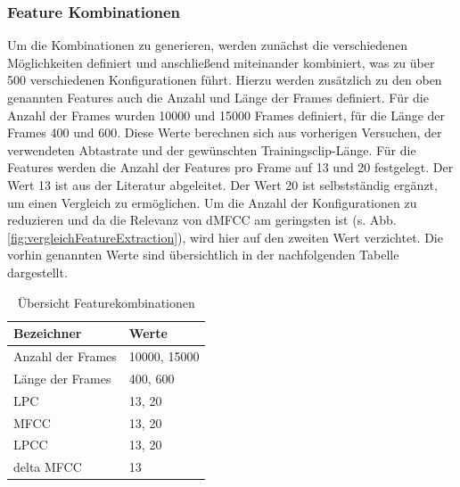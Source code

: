\subsubsection{Feature Kombinationen}

Um die Kombinationen zu generieren, werden zunächst die verschiedenen Möglichkeiten definiert und anschließend miteinander kombiniert, was zu über 500 verschiedenen Konfigurationen führt.
Hierzu werden zusätzlich zu den oben genannten Features auch die Anzahl und Länge der Frames definiert.
Für die Anzahl der Frames wurden 10000 und 15000 Frames definiert, für die Länge der Frames 400 und 600.
Diese Werte berechnen sich aus vorherigen Versuchen, der verwendeten Abtastrate und der gewünschten Trainingsclip-Länge.
Für die Features werden die Anzahl der Features pro Frame auf 13 und 20 festgelegt.
Der Wert 13 ist aus der Literatur abgeleitet. %
Der Wert 20 ist selbstständig ergänzt, um einen Vergleich zu ermöglichen.
Um die Anzahl der Konfigurationen zu reduzieren und da die Relevanz von \ac{dMFCC} am geringsten ist (s. Abb. \ref{fig:vergleichFeatureExtraction}), wird hier auf den zweiten Wert verzichtet.
Die vorhin genannten Werte sind übersichtlich in der nachfolgenden Tabelle dargestellt.
\begin{table}[H]
    \centering
    \begin{tabular}{l|l}
        \textbf{Bezeichner} & \textbf{Werte}   \\ \hline
        Anzahl der Frames   & 10000, 15000 \\ \hline
        Länge der Frames    & 400, 600     \\ \hline
        LPC                 & 13, 20       \\ \hline
        MFCC                & 13, 20       \\ \hline
        LPCC                & 13, 20       \\ \hline
        delta MFCC          & 13          
    \end{tabular}
    \caption{Übersicht Featurekombinationen}
\end{table}


